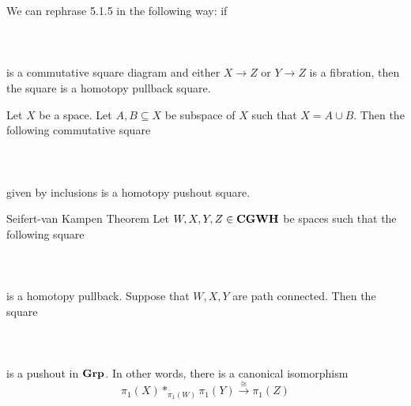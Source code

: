 \documentclass[a4paper]{article}
\begin{document}
We can rephrase 5.1.5 in the following way: if \\~\\
\\~\\
is a commutative square diagram and either $X\to Z$ or $Y\to Z$ is a fibration, then the square is a homotopy pullback square. 

\begin{lmm}{}{} Let $X$ be a space. Let $A,B\subseteq X$ be subspace of $X$ such that $X=A\cup B$. Then the following commutative square \\~\\
\\~\\
given by inclusions is a homotopy pushout square. 
\end{lmm}

\begin{thm}{Seifert-van Kampen Theorem}{} Let $W,X,Y,Z\in\bold{CGWH}$ be spaces such that the following square \\~\\
\\~\\
is a homotopy pullback. Suppose that $W,X,Y$ are path connected. Then the square \\~\\
\\~\\
is a pushout in $\bold{Grp}$. In other words, there is a canonical isomorphism $$\pi_1(X)\ast_{\pi_1(W)}\pi_1(Y)\overset{\cong}{\longrightarrow}\pi_1(Z)$$
\end{thm}
\end{document}
